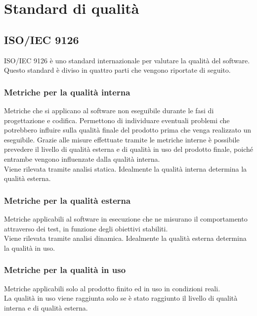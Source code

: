 \section{Standard di qualità}

	\subsection{ISO/IEC 9126}
	ISO/IEC 9126 è uno standard internazionale per valutare la qualità del software.\\%
	Questo standard è diviso in quattro parti che vengono riportate di seguito.
		\subsubsection{Metriche per la qualità interna}
		Metriche che si applicano al software non eseguibile durante le fasi di progettazione e codifica. Permettono di individuare eventuali problemi che potrebbero influire sulla qualità finale del prodotto prima che venga realizzato un eseguibile. Grazie alle misure effettuate tramite le metriche interne è possibile prevedere il livello di qualità esterna e di qualità in uso del prodotto finale, poiché entrambe vengono influenzate dalla qualità interna.\\
		Viene rilevata tramite analisi statica. Idealmente la qualità interna determina la qualità esterna.
		\subsubsection{Metriche per la qualità esterna}
		Metriche applicabili al software in esecuzione che ne misurano il comportamento attraverso dei test, in funzione degli obiettivi stabiliti.\\
		Viene rilevata tramite analisi dinamica. Idealmente la qualità esterna determina la qualità in uso.
		\subsubsection{Metriche per la qualità in uso}
		Metriche applicabili solo al prodotto finito ed in uso in condizioni reali.\\
		La qualità in uso viene raggiunta solo se è stato raggiunto il livello di qualità interna e di qualità esterna.
